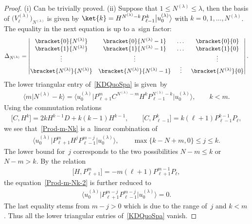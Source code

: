 \documentclass[pdftex]{sigma}
\numberwithin{equation}{section}
\begin{document}
\begin{proof}
(i) Can be trivially proved.
 (ii) Suppose that $ 1 \leq N^{(\lambda)} \leq \lambda$, then the basis of $
\big(V_{\ell}^{(\lambda)}\big)_{N^{(\lambda)}} $ is given by $ \ket{k} = H^{N^{(\lambda)}-k} P_{\ell-1}^k \big|u_0^{(\lambda)}\big\rangle
$ with $ k = 0, 1, \dots, N^{(\lambda)}$.
The equality in the next equation is up to a~sign factor:
\begin{gather}
\Delta_{N^{(\lambda)}} = \left|
\begin{matrix} \bracket{0}{N^{(\lambda)}} & \bracket{0}{N^{(\lambda)}-1} & \dots & \bracket{0}{0}
\\ \bracket{1}{N^{(\lambda)}} & \bracket{1}{N^{(\lambda)}-1} & \dots & \bracket{1}{0}
\\
\vdots & \vdots & & \vdots
\\
\bracket{N^{(\lambda)}}{N^{(\lambda)}} & \bracket{N^{(\lambda)}}{N^{(\lambda)}-1} & \vdots & \bracket{N^{(\lambda)}}{0}
\end{matrix}
\right|.
\label{KDQuoSpa}
\end{gather}
The lower triangular entry of~\eqref{KDQuoSpa} is given~by
\begin{gather}
\big\langle m \big|  N^{(\lambda)}-k\big\rangle  = \big\langle u_0^{(\lambda)}\big| P_{\ell+1}^m C^{N^{(\lambda)}-m} H^k P_{\ell-1}^{N^{(\lambda)}-k}
\big|u_0^{(\lambda)}\big\rangle ,
\qquad
k < m.
\label{Prod-m-Nk}
\end{gather}
Using the commutation relations
\begin{gather*}
\big[C, H^k\big] = 2k H^{k-1} D + k(k-1) H^{k-1},
\qquad
\big[C, P_{\ell-1}^k\big] = k (\ell+1) P_{\ell-1}^{k-1} P_{\ell},
\end{gather*}
we see that~\eqref{Prod-m-Nk} is a~linear combination of
\begin{gather}
\big\langle u_0^{(\lambda)}\big| P_{\ell+1}^m H^j P_{\ell-1}^{m-j} \big|u_0^{(\lambda)}\big\rangle ,
\qquad
\max\{k-N+m, 0\} \leq j \leq k.
\label{Prod-m-Nk-2}
\end{gather}
The lower bound for~$j$ corresponds to the two possibilities $ N-m \leq k $ or $ N-m > k$.
By the relation
\begin{gather*}
\big[H, P_{\ell+1}^m\big] = -m(\ell+1) P_{\ell+1}^{m-1} P_{\ell},
\end{gather*}
the equation~\eqref{Prod-m-Nk-2} is further reduced to
\begin{gather*}
\big\langle u_0^{(\lambda)}\big| P_{\ell+1}^{m-j} P_{\ell-1}^{m-j} \big|u_0^{(\lambda)}\big\rangle  = 0.
\end{gather*}
The last equality stems from $ m -j > 0 $ which is due to the range of~$j$ and $ k < m$.
Thus all the lower triangular entries of~\eqref{KDQuoSpa} vanish.


\end{proof}
\end{document}
